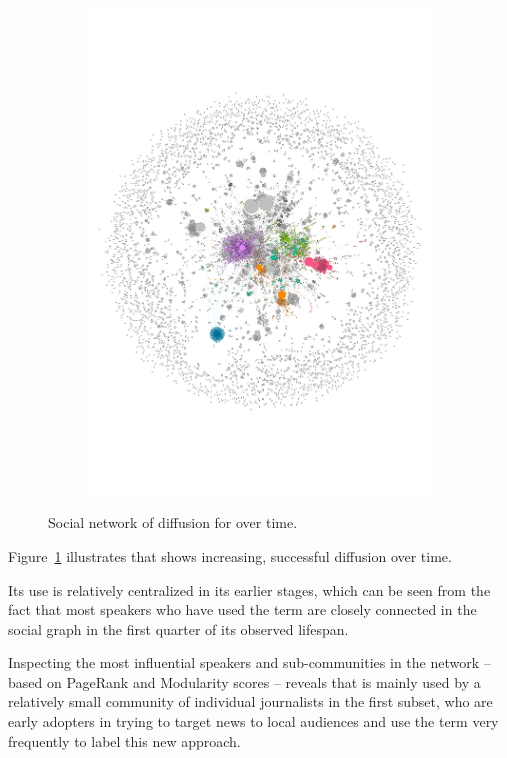 \documentclass[
  a4paper,
  abstract=on,
  captions=tableabove
  ]{scrartcl}
\begin{document}
\begin{figure}
\begin{subfigure}{.45\linewidth}
          \includegraphics[width=\linewidth, height=\textheight, keepaspectratio]{img/net_hyperlocal_four.pdf}
        \end{subfigure}
        \caption[Social networks of diffusion for ]{Social network of diffusion for  over time.}
        \label{fig:net_diac_hyperlocal}
      \end{figure}

      Figure~\ref{fig:net_diac_hyperlocal} illustrates that  shows increasing, successful diffusion over time.

      Its use is relatively centralized in its earlier stages, which can be seen from the fact that most speakers who have used the term are closely connected in the social graph in the first quarter of its observed lifespan.

      Inspecting the most influential speakers and sub-communities in the network -- based on PageRank and Modularity scores -- reveals that  is mainly used by a relatively small community of individual journalists in the first subset, who are early adopters in trying to target news to local audiences and use the term very frequently to label this new approach.
\end{document}
